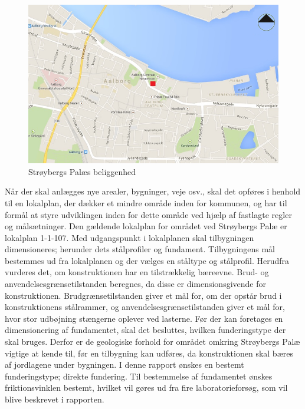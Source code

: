 \begin{figure}[htbp]
	\centering
	\includegraphics[width=1.0\textwidth]{billeder/aalborg.png}
	\caption{Strøybergs Palæs beliggenhed}
	\label{fig:aalborg}
\end{figure}

Når der skal anlægges nye arealer, bygninger, veje osv., skal det opføres i henhold til en lokalplan, der dækker et mindre område inden for kommunen, og har til formål at styre udviklingen inden for dette område ved hjælp af fastlagte regler og målsætninger. Den gældende lokalplan for området ved Strøybergs Palæ er lokalplan 1-1-107.
\newline
\newline
Med udgangspunkt i lokalplanen skal tilbygningen dimensioneres; herunder dets stålprofiler og fundament. 
\newline \indent{     }  Tilbygningens mål bestemmes ud fra lokalplanen og der vælges en ståltype og stålprofil. Herudfra vurderes det, om konstruktionen har en tilstrækkelig bæreevne. Brud- og anvendelsesgrænsetilstanden beregnes, da disse er dimensionsgivende for konstruktionen. Brudgrænsetilstanden giver et mål for, om der opstår brud i konstruktionens stålrammer, og anvendelsesgrænsetilstanden giver et mål for, hvor stor udbøjning stængerne oplever ved lasterne.
\newline \indent{     }  Før der kan foretages en dimensionering af fundamentet, skal det besluttes, hvilken funderingstype der skal bruges. Derfor er de geologiske forhold for området omkring Strøybergs Palæ vigtige at kende til, før en tilbygning kan udføres, da konstruktionen skal bæres af jordlagene under bygningen. I denne rapport ønskes en bestemt funderingstype; direkte fundering. Til bestemmelse af fundamentet ønskes friktionsvinklen bestemt, hvilket vil gøres ud fra fire laboratorieforsøg, som vil blive beskrevet i rapporten.